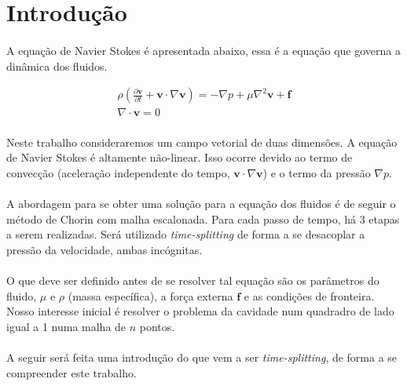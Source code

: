 \documentclass[introducao.tex]{subfiles}
\begin{document}
\section{Introdução}
\paragraph{} A equação de Navier Stokes é apresentada abaixo, essa é a equação que governa a dinâmica dos fluidos.

\begin{eqnarray}
\rho\left( \frac{\partial {\textbf{v}}}{\partial t}+\textbf{v}\cdot\nabla \textbf{v} \right)=-\nabla p+\mu\nabla^2 \textbf{v} + \textbf{f}\label{navierstokes}\\
\nabla\cdot\textbf{v}=0
\end{eqnarray}

\paragraph{} Neste trabalho consideraremos um campo vetorial de duas dimensões. A equação de Navier Stokes é altamente não-linear. Isso ocorre devido ao termo de convecção (aceleração independente do tempo, $\textbf{v}\cdot \nabla\textbf{v}$) e o termo da pressão $\nabla p$. 

\paragraph{} A abordagem para se obter uma solução para a equação dos fluidos é de seguir o método de Chorin\cite{chorin68} com malha escalonada. Para cada passo de tempo, há 3 etapas a serem realizadas. Será utilizado \textit{time-splitting} de forma a se desacoplar a pressão da velocidade, ambas incógnitas. 

\paragraph{} O que deve ser definido antes de se resolver tal equação são os parâmetros do fluido, $\mu$ e $\rho$ (massa específica), a força externa $\textbf{f}$ e as condições de fronteira. Nosso interesse inicial é resolver o problema da cavidade num quadradro de lado igual a 1 numa malha de $n$ pontos.
\paragraph{} A seguir será feita uma introdução do que vem a ser \textit{time-splitting}, de forma a se compreender este trabalho.
\end{document}
